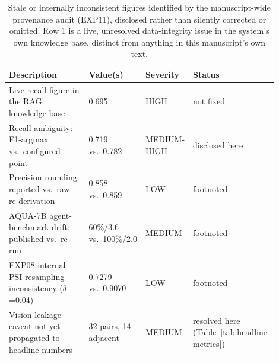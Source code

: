 \begin{table}[t]
\centering
\small
\caption{Stale or internally inconsistent figures identified by the manuscript-wide provenance
audit (EXP11), disclosed rather than silently corrected or omitted. Row 1 is a live, unresolved
data-integrity issue in the system's own knowledge base, distinct from anything in this
manuscript's own text.}
\label{tab:stale-figures}
\begin{tabular}{@{}p{0.46\linewidth}p{0.2\linewidth}p{0.12\linewidth}p{0.12\linewidth}@{}}
\toprule
Description & Value(s) & Severity & Status \\
\midrule
Live recall figure in the RAG knowledge base & 0.695 & HIGH & not fixed \\
Recall ambiguity: F1-argmax vs.\ configured point & 0.719 vs.\ 0.782 & MEDIUM-HIGH & disclosed here \\
Precision rounding: reported vs.\ raw re-derivation & 0.858 vs.\ 0.859 & LOW & footnoted \\
AQUA-7B agent-benchmark drift: published vs.\ re-run & 60\%/3.6 vs.\ 100\%/2.0 & MEDIUM & footnoted \\
EXP08 internal PSI resampling inconsistency ($\delta$=0.04) & 0.7279 vs.\ 0.9070 & LOW & footnoted \\
Vision leakage caveat not yet propagated to headline numbers & 32 pairs, 14 adjacent & MEDIUM & resolved here (Table~\ref{tab:headline-metrics}) \\
\bottomrule
\end{tabular}
\end{table}
